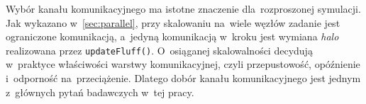 Wybór kanału komunikacyjnego ma istotne znaczenie dla~rozproszonej symulacji.
Jak wykazano w~\cref{sec:parallel}, przy skalowaniu na~wiele węzłów zadanie
jest ograniczone komunikacją, a~jedyną komunikacją w~kroku jest wymiana
\emph{halo} realizowana przez \texttt{updateFluff()}. O~osiąganej skalowalności
decydują w~praktyce właściwości warstwy komunikacyjnej, czyli przepustowość,
opóźnienie i~odporność na~przeciążenie. Dlatego dobór kanału komunikacyjnego jest jednym
z~głównych pytań badawczych w~tej pracy.
